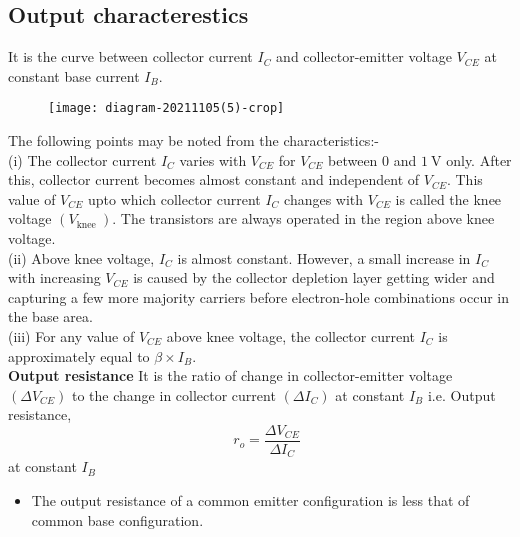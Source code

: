    \subsection{Output characterestics}
 It is the curve between collector current $I_{C}$ and collector-emitter voltage $V_{C E}$ at constant base current $I_{B}$.\\
 \begin{figure}[H]
 	\centering
 	\texttt{[image: diagram-20211105(5)-crop]}
 	\caption{}
 	\label{}
 \end{figure}
 The following points may be noted from the characteristics:-\\
 (i) The collector current $I_{C}$ varies with $V_{C E}$ for $V_{C E}$ between 0 and $1 \mathrm{~V}$ only. After this, collector current becomes almost constant and independent of $V_{C E}$. This value of $V_{C E}$ upto which collector current $I_{C}$ changes with $V_{C E}$ is called the knee voltage $\left(V_{\text {knee }}\right)$. The transistors are always operated in the region above knee voltage.\\
 (ii) Above knee voltage, $I_{C}$ is almost constant. However, a small increase in $I_{C}$ with increasing $V_{C E}$ is caused by the collector depletion layer getting wider and capturing a few more majority carriers before electron-hole combinations occur in the base area.\\
 (iii) For any value of $V_{C E}$ above knee voltage, the collector current $I_{C}$ is approximately equal to $\beta \times I_{B}$.\\
  \textbf{Output resistance}
  It is the ratio of change in collector-emitter voltage $\left(\Delta V_{C E}\right)$ to the change in collector current $\left(\Delta I_{C}\right)$ at constant $I_{B}$ i.e.
  Output resistance, $$\quad r_{o}=\frac{\Delta V_{C E}}{\Delta I_{C}}$$ at constant $I_{B}$\\
  \begin{itemize}
  	\item The output resistance of a common emitter configuration is less that of common base configuration.
  \end{itemize}
